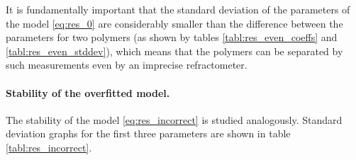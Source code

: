 \documentclass[11pt,a4paper]{article}
\theoremstyle{definition}
\begin{document}
It is fundamentally important that the standard deviation of the parameters of the model \eqref{eq:res_0}
are considerably smaller than the difference between the parameters for two polymers (as shown
by tables \ref{tabl:res_even_coeffs} and \ref{tabl:res_even_stddev}), which means that the polymers
can be separated by such measurements even by an imprecise refractometer.

\paragraph{Stability of the overfitted model.}

The stability of the model \eqref{eq:res_incorrect} is studied analogously. Standard deviation
graphs for the first three parameters are shown in table \ref{tabl:res_incorrect}.
\end{document}
